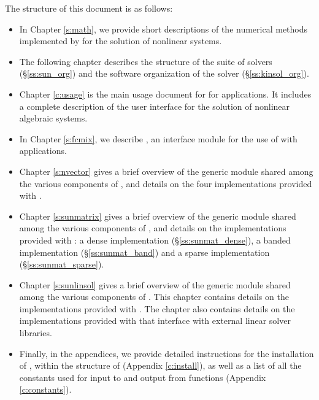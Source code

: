 The structure of this document is as follows:
\begin{itemize}
\item
  In Chapter \ref{s:math}, we provide short descriptions of the numerical
  methods implemented by {\kinsol} for the solution of nonlinear systems.
\item
  The following chapter describes the structure of the {\sundials} suite
  of solvers (\S\ref{ss:sun_org}) and the software organization of the {\kinsol}
  solver (\S\ref{ss:kinsol_org}).
\item
  Chapter \ref{c:usage} is the main usage document for {\kinsol} for {\CC} applications.
  It includes a complete description of the user interface for the solution
  of nonlinear algebraic systems.
\item
  In Chapter \ref{s:fcmix}, we describe {\fkinsol}, an interface module for the
  use of {\kinsol} with {\F} applications.
\item
  Chapter \ref{s:nvector} gives a brief overview of the generic {\nvector} module
  shared among the various components of {\sundials}, and details on the four 
  {\nvector} implementations provided with {\sundials}. 
\item
Chapter \ref{s:sunmatrix} gives a brief overview of the generic
  {\sunmatrix} module shared among the various components of
  {\sundials}, and details on the {\sunmatrix} implementations
  provided with {\sundials}: 
  a dense implementation (\S\ref{ss:sunmat_dense}),
  a banded implementation (\S\ref{ss:sunmat_band}) and
  a sparse implementation (\S\ref{ss:sunmat_sparse}).
\item
  Chapter \ref{s:sunlinsol} gives a brief overview of the generic
  {\sunlinsol} module shared among the various components of
  {\sundials}.  This chapter contains details on the {\sunlinsol}
  implementations provided with {\sundials}.
  The chapter
  also contains details on the {\sunlinsol} implementations provided
  with {\sundials} that interface with external linear solver
  libraries.
\item
  Finally, in the appendices, we provide detailed instructions for the installation
  of {\kinsol}, within the structure of {\sundials} (Appendix \ref{c:install}), as well
  as a list of all the constants used for input to and output from {\kinsol} functions
  (Appendix \ref{c:constants}).
\end{itemize}


